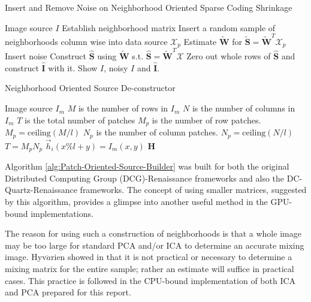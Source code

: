 \documentclass[11pt]{article}
\begin{document}
\begin{algorithm}
\caption{Insert and Remove Noise on Neighborhood Oriented Sparse Coding Shrinkage}
\label{alg:patch-oriented-sparse-coding-shrinkage-with-source}
\begin{algorithmic}
	\REQUIRE Image source $I$
	\STATE Establish neighborhood matrix
	\STATE Insert a random sample of neighborhoods column wise into data source $\mathbf{\mathcal{X}}_p$
	\STATE Estimate $\mathbf{\tilde{W}}$ for $\mathbf{\tilde{S}} = \mathbf{\tilde{W}}^T \mathbf{\mathcal{X}}_p$
	\STATE Insert noise
	\STATE Construct $\mathbf{\hat{S}}$ using $\mathbf{\tilde{W}}$ s.t. $\mathbf{\hat{S}} = \mathbf{\tilde{W}}^T \mathbf{\mathcal{X}}$
	\STATE Zero out whole rows of $\mathbf{\hat{S}}$ and construct $\mathbf{\hat{I}}$ with it. 
	\STATE Show $I$, noisy $I$ and $\mathbf{\hat{I}}$.
\end{algorithmic}
\end{algorithm}



\begin{algorithm}
\caption{Neighborhood Oriented Source De-constructor}
\label{alg:Patch-Oriented-Source-Builder}
\begin{algorithmic}
	\REQUIRE Image source $I_m$
	\STATE $M$ is the number of rows in $I_m$
	\STATE $N$ is the number of columns in $I_m$
	\STATE $T$ is the total number of patches
	\STATE $M_p$ is the number of row patches. $M_p = \textrm{ceiling}(M / l)$
	\STATE $N_p$ is the number of column patches. $N_p = \textrm{ceiling}(N / l)$
	\STATE $T = M_p N_p$
				\STATE $\vec{h}_i (x\% l +y) = I_m(x,y)$
			\ENDFOR
		\ENDFOR 
	\ENDFOR
	\RETURN $\mathbf{H}$
\end{algorithmic}
\end{algorithm}
Algorithm \ref{alg:Patch-Oriented-Source-Builder} was built for both the original Distributed Computing Group (DCG)-Renaissance frameworks and also the DC-Quartz-Renaissance frameworks.   The concept of using smaller matrices, suggested by this algorithm,  provides a glimpse into another useful method in the GPU-bound implementations.   

The reason for using such a construction of neighborhoods is that a whole image may be too large for standard PCA and/or ICA to determine an accurate mixing image.   Hyv$\ddot{a}$rien showed in \cite[260-271]{appo-ica-book} that it is not practical or necessary to determine a mixing matrix for the entire sample; rather an estimate will suffice in practical cases.   This practice is followed in the CPU-bound implementation of both ICA and PCA prepared for this report.
\end{document}
